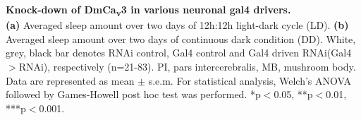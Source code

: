 \label{fig:S4}
\textbf{Knock-down of DmCa\textsubscript{v}3 in various neuronal gal4 drivers.}
\\
\textbf {(a)} Averaged sleep amount over two days of 12h:12h light-dark cycle (LD).
\textbf {(b)} Averaged sleep amount over two days of continuous dark condition (DD).
White, grey, black bar denotes RNAi control, Gal4 control and Gal4 driven RNAi(Gal4$>$RNAi), respectively (n=21-83).
PI, pars intercerebralis, MB, mushroom body. 
Data are represented as mean $\pm$ s.e.m.
For statistical analysis, Welch's ANOVA followed by Games-Howell post hoc test was performed.
*p$<$0.05, **p$<$0.01, ***p$<$0.001.
  
  
  